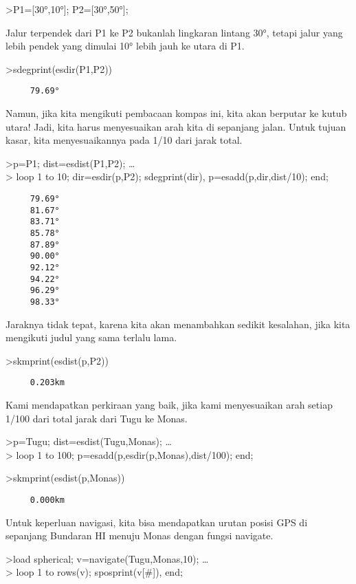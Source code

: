 \documentclass[
]{book}
\begin{document}
\textgreater P1={[}30°,10°{]}; P2={[}30°,50°{]};

Jalur terpendek dari P1 ke P2 bukanlah lingkaran lintang 30°, tetapi jalur yang lebih pendek yang dimulai 10° lebih jauh ke utara di P1.

\textgreater sdegprint(esdir(P1,P2))

\begin{verbatim}
     79.69°
\end{verbatim}

Namun, jika kita mengikuti pembacaan kompas ini, kita akan berputar ke kutub utara! Jadi, kita harus menyesuaikan arah kita di sepanjang jalan. Untuk tujuan kasar, kita menyesuaikannya pada 1/10 dari jarak total.

\textgreater p=P1; dist=esdist(P1,P2); \ldots{}\\
\textgreater{} loop 1 to 10; dir=esdir(p,P2); sdegprint(dir), p=esadd(p,dir,dist/10); end;

\begin{verbatim}
     79.69°
     81.67°
     83.71°
     85.78°
     87.89°
     90.00°
     92.12°
     94.22°
     96.29°
     98.33°
\end{verbatim}

Jaraknya tidak tepat, karena kita akan menambahkan sedikit kesalahan, jika kita mengikuti judul yang sama terlalu lama.

\textgreater skmprint(esdist(p,P2))

\begin{verbatim}
     0.203km
\end{verbatim}

Kami mendapatkan perkiraan yang baik, jika kami menyesuaikan arah setiap 1/100 dari total jarak dari Tugu ke Monas.

\textgreater p=Tugu; dist=esdist(Tugu,Monas); \ldots{}\\
\textgreater{} loop 1 to 100; p=esadd(p,esdir(p,Monas),dist/100); end;

\textgreater skmprint(esdist(p,Monas))

\begin{verbatim}
     0.000km
\end{verbatim}

Untuk keperluan navigasi, kita bisa mendapatkan urutan posisi GPS di sepanjang Bundaran HI menuju Monas dengan fungsi navigate.

\textgreater load spherical; v=navigate(Tugu,Monas,10); \ldots{}\\
\textgreater{} loop 1 to rows(v); sposprint(v{[}\#{]}), end;
\end{document}
